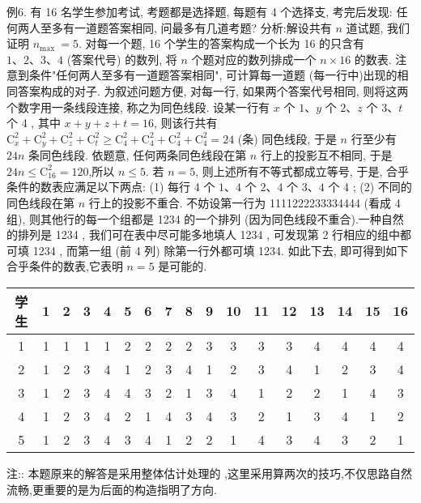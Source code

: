 例6. 有 16 名学生参加考试, 考题都是选择题, 每题有 4 个选择支, 考完后发现: 任何两人至多有一道题答案相同, 问最多有几道考题?
分析:解设共有 $n$ 道试题, 我们证明 $n_{\text {max }}=5$.
对每一个题, 16 个学生的答案构成一个长为 16 的只含有 $1 、 2 、 3 、 4$ (答案代号) 的数列, 将 $n$ 个题对应的数列排成一个 $n \times 16$ 的数表.
注意到条件"任何两人至多有一道题答案相同", 可计算每一道题 (每一行中)出现的相同答案构成的对子.
为叙述问题方便, 对每一行, 如果两个答案代号相同, 则将这两个数字用一条线段连接, 称之为同色线段.
设某一行有 $x$ 个 $1 、 y$ 个 $2 、 z$ 个 $3 、 t$ 个 4 , 其中 $x+y+z+t=16$, 则该行共有 $\mathrm{C}_x^2+\mathrm{C}_y^2+ \mathrm{C}_z^2+\mathrm{C}_t^2 \geqslant \mathrm{C}_4^2+\mathrm{C}_4^2+\mathrm{C}_4^2+\mathrm{C}_4^2=24$ (条) 同色线段, 于是 $n$ 行至少有 $24 n$ 条同色线段.
依题意, 任何两条同色线段在第 $n$ 行上的投影互不相同, 于是 $24 n \leqslant \mathrm{C}_{16}^2=120$,所以 $n \leqslant 5$.
若 $n=5$, 则上述所有不等式都成立等号, 于是, 合乎条件的数表应满足以下两点:
(1) 每行 4 个 $1 、 4$ 个 $2 、 4$ 个 $3 、 4$ 个 4 ;
(2) 不同的同色线段在第 $n$ 行上的投影不重合.
不妨设第一行为 1111222233334444 (看成 4 组), 则其他行的每一个组都是 1234 的一个排列 (因为同色线段不重合).一种自然的排列是 1234 , 我们可在表中尽可能多地填人 1234 , 可发现第 2 行相应的组中都可填 1234 , 而第一组 (前 4 列) 除第一行外都可填 1234. 如此下去, 即可得到如下合乎条件的数表,它表明 $n=5$ 是可能的.
\begin{tabular}{|c|c|c|c|c|c|c|c|c|c|c|c|c|c|c|c|c|}
\hline 学生 & 1 & 2 & 3 & 4 & 5 & 6 & 7 & 8 & 9 & 10 & 11 & 12 & 13 & 14 & 15 & 16 \\
\hline 1 & 1 & 1 & 1 & 1 & 2 & 2 & 2 & 2 & 3 & 3 & 3 & 3 & 4 & 4 & 4 & 4 \\
\hline 2 & 1 & 2 & 3 & 4 & 1 & 2 & 3 & 4 & 1 & 2 & 3 & 4 & 1 & 2 & 3 & 4 \\
\hline 3 & 1 & 2 & 3 & 4 & 4 & 3 & 2 & 1 & 3 & 4 & 1 & 2 & 2 & 1 & 4 & 3 \\
\hline 4 & 1 & 2 & 3 & 4 & 2 & 1 & 4 & 3 & 4 & 3 & 2 & 1 & 3 & 4 & 1 & 2 \\
\hline 5 & 1 & 2 & 3 & 4 & 3 & 4 & 1 & 2 & 2 & 1 & 4 & 3 & 4 & 3 & 2 & 1 \\
\hline
\end{tabular}
注:: 本题原来的解答是采用整体估计处理的 ,这里采用算两次的技巧,不仅思路自然流畅,更重要的是为后面的构造指明了方向.



